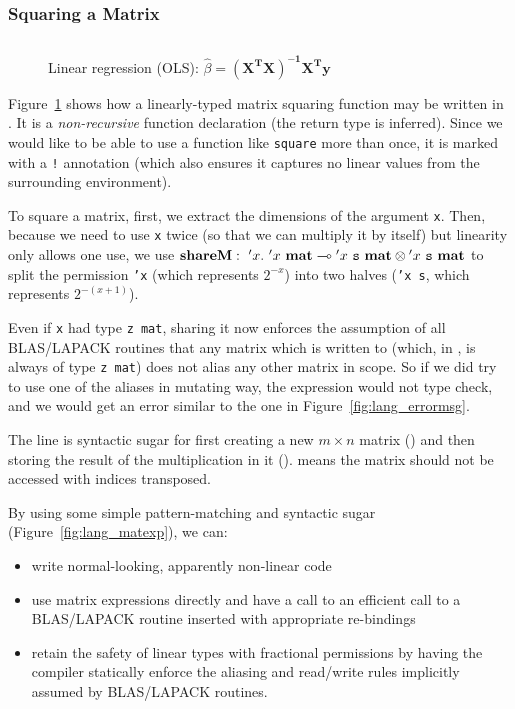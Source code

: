\subsubsection{Squaring a Matrix}

\begin{figure}[t]
    \centering
    \inputminted[fontsize=\small]{ocaml}{../../examples/square.lt}
    \caption{Linear regression (OLS): $\hat\beta =
        \mathbf{(X^T X)^{-1} X^T y}$}\label{fig:lang_square}
\end{figure}

Figure~\ref{fig:lang_square} shows how a linearly-typed matrix squaring
function may be written in \lang. It is a \emph{non-recursive} function
declaration (the return type is inferred). Since we would like to be able to
use a function like \texttt{square} more than once, it is marked with a
\texttt{!} annotation (which also ensures it captures no linear values from the
surrounding environment).

To square a matrix, first, we extract the dimensions of the argument
\texttt{x}. Then, because we need to use \texttt{x} twice (so that we can
multiply it by itself) but linearity only allows one use, we use
$\mathbf{shareM}:\ {'x}.\ {{'x}\ \mathbf{mat}} \multimap {{'x}\ \texttt{s}\ \mathbf{mat}} \otimes
{{'x}\ \texttt{s}\ \mathbf{mat}}$ to split the permission \texttt{'x} (which represents
$2^{-x}$) into two halves (\texttt{'x s}, which represents $2^{-(x+1)}$).

Even if \texttt{x} had type \texttt{z mat}, sharing it now enforces the
assumption of all BLAS/LAPACK routines that any matrix which is written to
(which, in \lang, is always of type \texttt{z mat}) does not alias any other
matrix in scope. So if we did try to use one of the aliases in mutating way,
the expression would not type check, and we would get an error similar to the
one in Figure~\ref{fig:lang_errormsg}.

The line  is syntactic sugar for
first creating a new $m \times n$ matrix () and
then storing the result of the multiplication in it ().  means
the matrix should not be accessed with indices transposed.

By using some simple pattern-matching and syntactic sugar
(Figure~\ref{fig:lang_matexp}), we can:
\begin{itemize}
    \item write normal-looking, apparently non-linear code
    \item use matrix expressions directly and have a call to an efficient
        call to a BLAS/LAPACK routine inserted with appropriate re-bindings
    \item retain the safety of linear types with fractional permissions by
        having the compiler statically enforce the aliasing and read/write rules
        implicitly assumed by BLAS/LAPACK routines.
\end{itemize}

